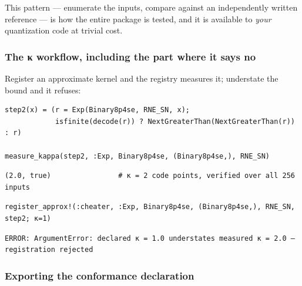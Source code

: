 This pattern — enumerate the inputs, compare against an independently written reference — is how the entire package is tested, and it is available to \emph{your} quantization code at trivial cost.



\subsubsection{The κ workflow, including the part where it says no}



\label{64156751436703573}{}


Register an approximate kernel and the registry measures it; understate the bound and it refuses:




\nopagebreak[4]
\begin{minipage}{\linewidth}
\begin{verbatim}
step2(x) = (r = Exp(Binary8p4se, RNE_SN, x);
            isfinite(decode(r)) ? NextGreaterThan(NextGreaterThan(r)) : r)

measure_kappa(step2, :Exp, Binary8p4se, (Binary8p4se,), RNE_SN)
\end{verbatim}




\begin{verbatim}
(2.0, true)                # κ = 2 code points, verified over all 256 inputs
\end{verbatim}




\begin{verbatim}
register_approx!(:cheater, :Exp, Binary8p4se, (Binary8p4se,), RNE_SN, step2; κ=1)
\end{verbatim}




\begin{verbatim}
ERROR: ArgumentError: declared κ = 1.0 understates measured κ = 2.0 — registration rejected
\end{verbatim}
\end{minipage}




\subsubsection{Exporting the conformance declaration}



\label{14596415327394333925}{}



